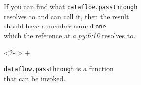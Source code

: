 \documentclass[aspectratio=169]{beamer}
\begin{document}
\begin{frame}[fragile]
\begin{center}
\begin{minipage}[c][2cm][c]{0.46\textwidth}
            \begin{center}
            \smaller[1]
            If you can find what \texttt{dataflow.passthrough} \\
            resolves to and can call it, then the result \\
            should have a member named \texttt{one} \\
            which the reference at \textsl{a.py:6:16} resolves to. \\
            \end{center}
        \end{minipage}
        \begin{uncoverenv}<2- >
            \; $+$ \;
        \begin{minipage}[c][2cm][c]{0.46\textwidth}
            \begin{center}
            \smaller[1]
            \texttt{dataflow.passthrough} is a function \\
            that can be invoked. \\
            \end{center}
        \end{minipage}
        \end{uncoverenv}
    \end{center}
\end{frame}
\end{document}
